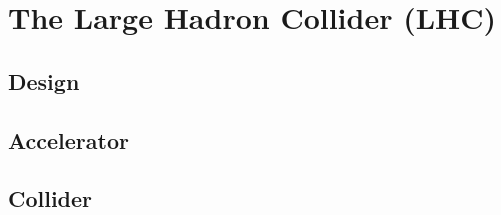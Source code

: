 \chapter{The Large Hadron Collider (LHC)}\label{chapter:LHC}

\section{Design}

\section{Accelerator}

\section{Collider}
